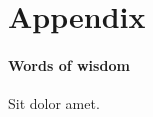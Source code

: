 \documentclass[main.tex]{subfiles}
\begin{document}
\setcounter{section}{1}
\renewcommand{\thesection}{\Alpha{section}}
\setcounter{figure}{0}


\section*{Appendix}\label{s:conclusion}

\paragraph{Words of wisdom} Sit dolor amet.
\end{document}
